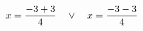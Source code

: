 \documentclass[preview]{standalone}
\begin{document}
\begin{align*}
\special{dvisvgm:raw <g id='unique000'>}x=\frac{-3 + 3}{4} \quad \lor \quad x=\frac{-3 - 3}{4}\special{dvisvgm:raw </g>}
\end{align*}
\end{document}
